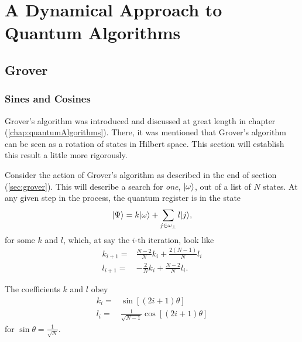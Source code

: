 
\chapter{A Dynamical Approach to Quantum Algorithms}
\label{chap:dynamics}
%

\section{Grover}

\subsection{Sines and Cosines}
\label{ssec:sincos}

Grover's algorithm was introduced and discussed at great length in
chapter (\ref{chap:quantumAlgorithms}).  There, it was mentioned that
Grover's algorithm can be seen as a rotation of states in Hilbert
space.  This section will establish this result a little more rigorously.

Consider the action of Grover's algorithm as described in the end of
section (\ref{sec:grover}).  This will describe a search for \emph{one},
${|{\omega}\rangle}$,
out of a list of $N$ states.  At any given step in the process, the
quantum register is in the state
\begin{equation}
{|{\Psi}\rangle} = k{|{\omega}\rangle} + \sum_{j\in\omega_\perp}l{|{j}\rangle},
\end{equation}
for some $k$ and $l$, which, at say the $i$-th iteration, 
look like
\begin{equation}
\begin{split}
k_{i+1} =& \frac{N-2}{N}k_i + \frac{2(N-1)}{N}l_i\\
l_{i+1} =& -\frac{2}{N}k_i + \frac{N-2}{N}l_i.
\end{split}
\label{e:discsincos}
\end{equation}

\begin{prop}
The coefficients $k$ and $l$ obey
\begin{equation}
\begin{split}
k_i =& \sin\left[\left(2i+1\right)\theta\right]\\
l_i =& \frac{1}{\sqrt{N-1}}\cos\left[\left(2i+1\right)\theta\right]
\end{split}
\label{e:sincos}
\end{equation}
for $\sin\theta = \frac{1}{\sqrt{N}}$.
\end{prop}

